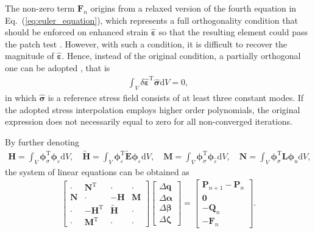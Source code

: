 \documentclass[3p,sort&compress,review,11pt]{elsarticle}
\newcommand*{\md}[1]{\mathrm{d}#1}
\newcommand*{\va}[1]{\delta#1}
\newcommand*{\mT}{\mathrm{T}}
\newcommand*{\eqsref}[1]{Eq.~(\ref{#1})}
\begin{document}
The non-zero term $\mathbold{F}_n$ origins from a relaxed version of the fourth equation in \eqsref{eq:euler_equation}, which represents a full orthogonality condition that should be enforced on enhanced strain $\hat{\mathbold{\varepsilon}}$ so that the resulting element could pass the patch test \citep{Simo1990}. However, with such a condition, it is difficult to recover the magnitude of $\hat{\mathbold{\varepsilon}}$. Hence, instead of the original condition, a partially orthogonal one can be adopted \citep{Piltner1995}, that is
\begin{gather*}
\int_V\va{\hat{\mathbold{\varepsilon}}}^\mT\hat{\mathbold{\sigma}}\md{V}=0,
\end{gather*}
in which $\hat{\mathbold{\sigma}}$ is a reference stress field consists of at least three constant modes. If the adopted stress interpolation employs higher order polynomials, the original expression does not necessarily equal to zero for all non-converged iterations.

By further denoting
\begin{gather}
\mathbold{H}=\int_{V}\mathbold{\phi}_\sigma^\mT\mathbold{\phi}_\varepsilon\md{V},\quad
\tilde{\mathbold{H}}=\int_{V}\mathbold{\phi}_\varepsilon^\mT\tilde{\mathbold{E}}\mathbold{\phi}_\varepsilon\md{V},\quad
\mathbold{M}=\int_{V}\mathbold{\phi}_\sigma^\mT\mathbold{\phi}_{\hat{\varepsilon}}\md{V},\quad
\mathbold{N}=\int_{V}\mathbold{\phi}_\sigma^\mT\mathbold{L}\mathbold{\phi}_u\md{V},
\end{gather}
the system of linear equations can be obtained as
\begin{gather}\label{eq:solving_system}
\begin{bmatrix}
	\cdot        & \mathbold{N}^\mT  & \cdot                & \cdot        \\
	\mathbold{N} & \cdot             & -\mathbold{H}        & \mathbold{M} \\
	\cdot        & -\mathbold{H}^\mT & \tilde{\mathbold{H}} & \cdot        \\
	\cdot        & \mathbold{M}^\mT  & \cdot                & \cdot
\end{bmatrix}\begin{bmatrix}
\Delta\mathbold{q}\\\Delta\mathbold{\alpha}\\\Delta\mathbold{\beta}\\\Delta\mathbold{\zeta}
\end{bmatrix}=\begin{bmatrix}
\mathbold{P}_{n+1}-\mathbold{P}_n\\\mathbold{0}\\-\mathbold{Q}_n\\-\mathbold{F}_n
\end{bmatrix}.
\end{gather}
\end{document}
